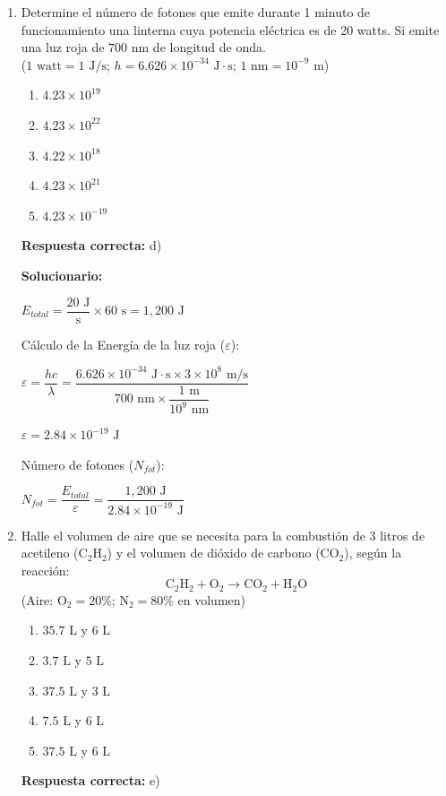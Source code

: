 \begin{enumerate}[resume]

	\vspace{6mm}

	\item Determine el número de fotones que emite durante 1 minuto de funcionamiento una linterna cuya potencia eléctrica es de 20 watts. Si emite una luz roja de $700\text{ nm}$ de longitud de onda.\\
	($1\text{ watt} = 1\text{ J/s}$; $h = 6.626 \times 10^{-34}\text{ J}\cdot\text{s}$; $1\text{ nm} = 10^{-9}\text{ m}$)
	\begin{enumerate}[label=\alph*)]
		\item $4.23 \times 10^{19}$
		\item $4.23 \times 10^{22}$
		\item $4.22 \times 10^{18}$
		\item $4.23 \times 10^{21}$
		\item $4.23 \times 10^{-19}$
	\end{enumerate}
	\textbf{Respuesta correcta:} d)

	\vspace{2mm}
	\textbf{Solucionario:}

	$E_{total} = \dfrac{20\text{ J}}{\text{s}} \times 60\text{ s} = 1,200\text{ J}$

	Cálculo de la Energía de la luz roja ($\varepsilon$):

	$ \varepsilon = \dfrac{hc}{\lambda} = \dfrac{6.626 \times 10^{-34}\text{ J}\cdot\text{s} \times 3 \times 10^8\text{ m/s}}{700\text{ nm} \times \dfrac{1\text{ m}}{10^9\text{ nm}}} $

	$ \varepsilon = 2.84 \times 10^{-19}\text{ J} $

	Número de fotones ($N_{fot}$):

	$ N_{fot} = \dfrac{E_{total}}{\varepsilon} = \dfrac{1,200\text{ J}}{2.84 \times 10^{-19}\text{ J}} $\\


	\vspace{6mm}

	\item Halle el volumen de aire que se necesita para la combustión de 3 litros de acetileno ($\text{C}_2\text{H}_2$) y el volumen de dióxido de carbono ($\text{CO}_2$), según la reacción:
	\[ \text{C}_2\text{H}_2 + \text{O}_2 \rightarrow \text{CO}_2 + \text{H}_2\text{O} \]
	(Aire: $\text{O}_2 = 20\%$; $\text{N}_2 = 80\%$ en volumen)
	\begin{enumerate}[label=\alph*)]
		\item $35.7\text{ L}$ y $6\text{ L}$
		\item $3.7\text{ L}$ y $5\text{ L}$
		\item $37.5\text{ L}$ y $3\text{ L}$
		\item $7.5\text{ L}$ y $6\text{ L}$
		\item $37.5\text{ L}$ y $6\text{ L}$
	\end{enumerate}
	\textbf{Respuesta correcta:} e)


\end{enumerate}
